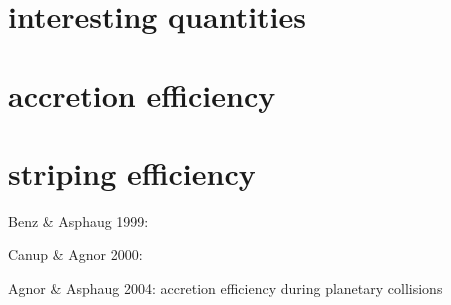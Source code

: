 \section{interesting quantities}
\section{accretion efficiency}
\section{striping efficiency}

\cite{Chambers:2001p2105}
\citep{chandrasekhar1969ellipsoidal}
\cite{Lissauer:1993p56}
\cite{Wetherill:1993p3351}






\cite{Benz:1988p3336}

\cite{Benz1999Icar..142....5B}
Benz \& Asphaug 1999:

\cite{Canup:2000p3542}
Canup \& Agnor 2000:
	
\cite{Agnor:2004p3329}
Agnor \& Asphaug 2004: accretion efficiency during planetary collisions

